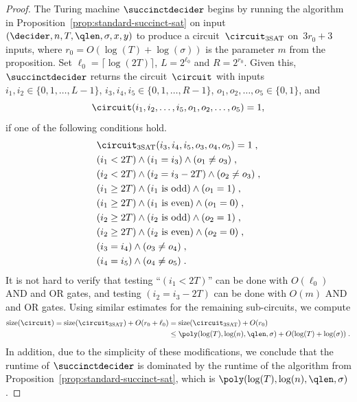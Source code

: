 \begin{proof}
  The Turing machine $\succinctdecider$ begins by running the algorithm in
  Proposition~\ref{prop:standard-succinct-sat} on input
  $(\decider,n,T,\qlen,\sigma, x,y)$ to produce a
  circuit~$\circuit_{\mathrm{3SAT}}$ on~$3r_0+3$ inputs, where $r_0 =
  O(\log(T)+\log(\sigma))$ is the parameter $m$ from the proposition.
  Set $\ell_0 = \lceil \log(2T) \rceil$, $L = 2^{\ell_0}$ and $R = 2^{r_0}$.
  Given this, $\succinctdecider$ returns the circuit~$\circuit$ with inputs
  $i_1, i_2 \in \{0, 1, \ldots, L-1\}$, $i_3, i_4, i_5 \in \{0, 1, \ldots,
  R-1\}$, $o_1, o_2, \ldots, o_5 \in \{0, 1\}$, and
  \[
    \circuit(i_1, i_2, \ldots, i_5, o_1, o_2, \ldots, o_5) = 1,
  \]
  if one of the following conditions hold.
  \begin{align*}
    & \circuit_{\mathrm{3SAT}}(i_3, i_4, i_5, o_3, o_4, o_5) = 1\;,\\
    & (i_1 < 2T) \land (i_1 = i_3) \land (o_1 \neq o_3)\;,\\
    & (i_2 < 2T)\land (i_2 = i_3 - 2T) \land (o_2 \neq o_3)\;,\\
    & (i_1 \geq 2T) \land (\text{$i_1$ is odd}) \land (o_1 = 1)\;,\\
    & (i_1 \geq 2T) \land (\text{$i_1$ is even}) \land (o_1 = 0)\;,\\
    & (i_2 \geq 2T) \land (\text{$i_2$ is odd}) \land (o_2 = 1)\;,\\
    & (i_2 \geq 2T) \land (\text{$i_2$ is even}) \land (o_2 = 0)\;,\\
    & (i_3 = i_4) \land (o_3 \neq o_4)\;,\\
    & (i_4 = i_5) \land (o_4 \neq o_5)\;.
  \end{align*}
  It is not hard to verify that testing ``$(i_1 < 2T)$'' can be done with
  $O(\ell_0)$ AND and OR gates, and testing $(i_2 = i_3 - 2T)$ can be done with
  $O(m)$ AND and OR gates.
  Using similar estimates for the remaining sub-circuits, we compute
  \begin{equation*}
    \begin{split}
      \mathrm{size}(\circuit) = \mathrm{size}(\circuit_{\mathrm{3SAT}}) +
      O(r_0 + \ell_0) & = \mathrm{size}(\circuit_{\mathrm{3SAT}}) + O(r_0) \\
      & \leq \poly(\log(T), \log(n), \qlen,\sigma) + O(\log(T) + \log(\sigma))\;.
    \end{split}
  \end{equation*}
  In addition, due to the simplicity of these modifications, we conclude that
  the runtime of $\succinctdecider$ is dominated by the runtime of the algorithm
  from Proposition~\ref{prop:standard-succinct-sat}, which is $\poly(\log(T),
  \log(n), \qlen,\sigma)$.


\end{proof}
